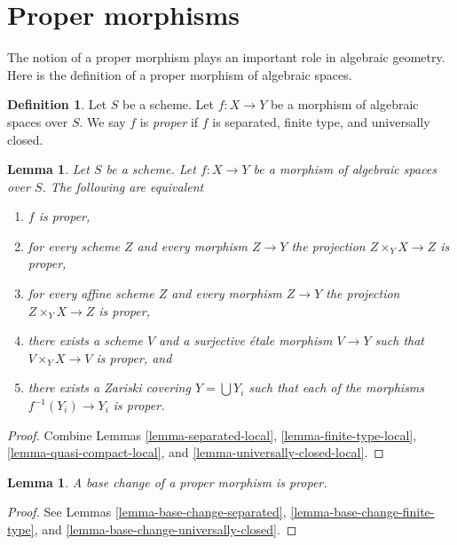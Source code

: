 \documentclass{stacks-project}
\theoremstyle{plain}
\newtheorem{lemma}[subsection]{Lemma}
\theoremstyle{definition}
\newtheorem{definition}[subsection]{Definition}
\theoremstyle{remark}
\numberwithin{equation}{subsection}
\begin{document}
\section{Proper morphisms}
\label{section-proper}

\noindent
The notion of a proper morphism plays an important role in algebraic geometry.
Here is the definition of a proper morphism of algebraic spaces.

\begin{definition}
\label{definition-proper}
Let $S$ be a scheme.
Let $f : X \to Y$ be a morphism of algebraic spaces over $S$.
We say $f$ is {\it proper} if $f$ is separated, finite type, and
universally closed.
\end{definition}

\begin{lemma}
\label{lemma-proper-local}
Let $S$ be a scheme. Let $f : X \to Y$ be a morphism of algebraic spaces
over $S$. The following are equivalent
\begin{enumerate}
\item $f$ is proper,
\item for every scheme $Z$ and every morphism $Z \to Y$
the projection $Z \times_Y X \to Z$ is proper,
\item for every affine scheme $Z$ and every morphism $Z \to Y$
the projection $Z \times_Y X \to Z$ is proper,
\item there exists a scheme $V$ and a surjective \'etale morphism
$V \to Y$ such that $V \times_Y X \to V$ is proper, and
\item there exists a Zariski covering $Y = \bigcup Y_i$ such that
each of the morphisms $f^{-1}(Y_i) \to Y_i$ is proper.
\end{enumerate}
\end{lemma}

\begin{proof}
Combine Lemmas \ref{lemma-separated-local},
\ref{lemma-finite-type-local},
\ref{lemma-quasi-compact-local}, and
\ref{lemma-universally-closed-local}.
\end{proof}

\begin{lemma}
\label{lemma-base-change-proper}
A base change of a proper morphism is proper.
\end{lemma}

\begin{proof}
See
Lemmas \ref{lemma-base-change-separated},
\ref{lemma-base-change-finite-type}, and
\ref{lemma-base-change-universally-closed}.
\end{proof}
\end{document}
